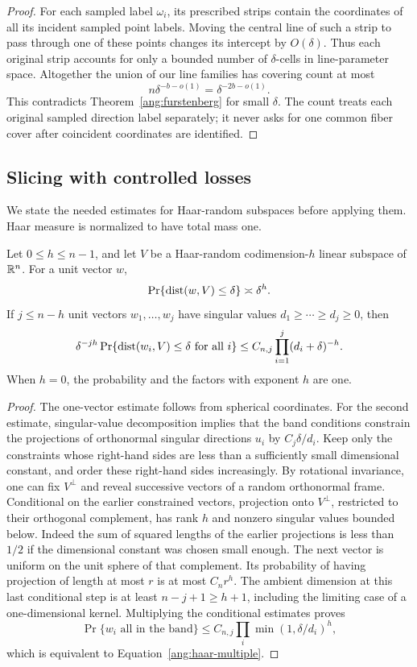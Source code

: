 \begin{proof}
For each sampled label $\omega_i$, its prescribed strips contain the
coordinates of all its incident sampled point labels. Moving the central
line of such a strip to pass through one of these points changes its
intercept by $O(\delta)$. Thus each original strip accounts for only a
bounded number of $\delta$-cells in line-parameter space. Altogether the
union of our line families has covering count at most
\[
 n\delta^{-b-o(1)}=\delta^{-2b-o(1)}.
\]
This contradicts Theorem~\ref{ang:furstenberg} for small $\delta$.
The count treats each original sampled direction label separately; it
never asks for one common fiber cover after coincident coordinates are
identified.
\end{proof}

\subsection{Slicing with controlled losses}

We state the needed estimates for Haar-random subspaces before applying
them. Haar measure is normalized to have total mass one.

\begin{lemma}\label{ang:haar}
Let $0\le h\le n-1$, and let $V$ be a Haar-random codimension-$h$
linear subspace of $\mathbb R^n$.
For a unit vector $w$,
\[
 \Pr\{\operatorname{dist}(w,V)\le\delta\}\asymp\delta^h.
\]
If $j\le n-h$ unit vectors $w_1,\ldots,w_j$ have singular values
$d_1\ge\cdots\ge d_j\ge0$, then
\begin{equation}\label{ang:haar-multiple}
 \delta^{-jh}\Pr\{\operatorname{dist}(w_i,V)\le\delta\text{ for all }i\}
       \le C_{n,j}\prod_{i=1}^j(d_i+\delta)^{-h}.
\end{equation}
When $h=0$, the probability and the factors with exponent $h$ are one.
\end{lemma}

\begin{proof}
The one-vector estimate follows from spherical coordinates. For the
second estimate, singular-value decomposition implies that the band
conditions constrain the projections of orthonormal singular directions
$u_i$ by $C_j\delta/d_i$. Keep only the constraints whose right-hand
sides are less than a sufficiently small dimensional constant, and
order these right-hand sides increasingly. By rotational invariance,
one can fix $V^\perp$ and reveal successive vectors of a random
orthonormal frame. Conditional on the earlier constrained vectors,
projection onto $V^\perp$, restricted to their orthogonal complement,
has rank $h$ and nonzero singular values bounded below. Indeed the sum
of squared lengths of the earlier projections is less than $1/2$ if
the dimensional constant was chosen small enough. The next vector is
uniform on the unit sphere of that complement. Its probability of
having projection of length at most $r$ is at most $C_n r^h$.
The ambient dimension at this last conditional step is at least
$n-j+1\ge h+1$, including the limiting case of a one-dimensional
kernel. Multiplying the conditional estimates proves
\[
 \Pr\{w_i\text{ all in the band}\}
       \le C_{n,j}\prod_i\min(1,\delta/d_i)^h,
\]
which is equivalent to Equation~\eqref{ang:haar-multiple}.
\end{proof}


